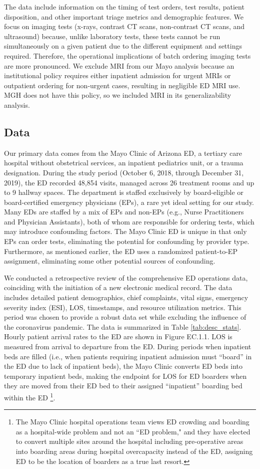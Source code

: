 \documentclass[,,blindrev]{informs}
\begin{document}
The data include information on the timing of test orders, test results,
patient disposition, and other important triage metrics and demographic
features. We focus on imaging tests (x-rays, contrast CT scans,
non-contrast CT scans, and ultrasound) because, unlike laboratory tests,
these tests cannot be run simultaneously on a given patient due to the
different equipment and settings required. Therefore, the operational
implications of batch ordering imaging tests are more pronounced. We
exclude MRI from our Mayo analysis because an institutional policy
requires either inpatient admission for urgent MRIs or outpatient
ordering for non-urgent cases, resulting in negligible ED MRI use. MGH
does not have this policy, so we included MRI in its generalizability
analysis.

\subsection{Data}\label{sec:data}

Our primary data comes from the Mayo Clinic of Arizona ED, a tertiary
care hospital without obstetrical services, an inpatient pediatrics
unit, or a trauma designation. During the study period (October 6, 2018,
through December 31, 2019), the ED recorded 48,854 visits, managed
across 26 treatment rooms and up to 9 hallway spaces. The department is
staffed exclusively by board-eligible or board-certified emergency
physicians (EPs), a rare yet ideal setting for our study. Many EDs are
staffed by a mix of EPs and non-EPs (e.g., Nurse Practitioners and
Physician Assistants), both of whom are responsible for ordering tests,
which may introduce confounding factors. The Mayo Clinic ED is unique in
that only EPs can order tests, eliminating the potential for confounding
by provider type. Furthermore, as mentioned earlier, the ED uses a
randomized patient-to-EP assignment, eliminating some other potential
sources of confounding.

We conducted a retrospective review of the comprehensive ED operations
data, coinciding with the initiation of a new electronic medical record.
The data includes detailed patient demographics, chief complaints, vital
signs, emergency severity index (ESI), LOS, timestamps, and resource
utilization metrics. This period was chosen to provide a robust data set
while excluding the influence of the coronavirus pandemic. The data is
summarized in Table \ref{tab:desc_stats}. Hourly patient arrival rates
to the ED are shown in Figure EC.1.1. LOS is measured from arrival to
departure from the ED. During periods when inpatient beds are filled
(i.e., when patients requiring inpatient admission must ``board'' in the
ED due to lack of inpatient beds), the Mayo Clinic converts ED beds into
temporary inpatient beds, making the endpoint for LOS for ED boarders
when they are moved from their ED bed to their assigned ``inpatient''
boarding bed within the ED
\footnote{The Mayo Clinic hospital operations team views ED crowding and boarding as a hospital-wide problem and not an ``ED problem," and they have elected to convert multiple sites around the hospital including pre-operative areas into boarding areas during hospital overcapacity instead of the ED, assigning ED to be the location of boarders as a true last resort.}.
\end{document}
